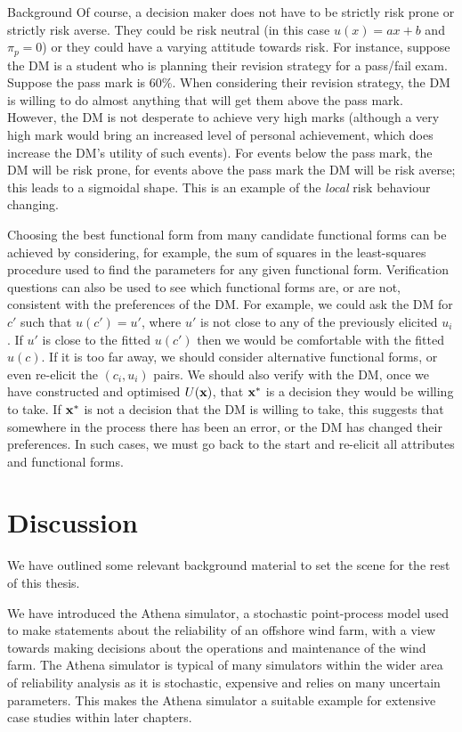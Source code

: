 \begin{chapter}{Background \label{Ch:background}}
Of course, a decision maker does not have to be strictly risk prone or strictly risk averse. They could be risk neutral (in this case $u(x) = ax + b$ and $\pi_p  = 0$) or they could have a varying attitude towards risk. For instance, suppose the DM is a student who is planning their revision strategy for a pass/fail exam. Suppose the pass mark is $60\%$. When considering their revision strategy, the DM is willing to do almost anything that will get them above the pass mark. However, the DM is not desperate to achieve very high marks (although a very high mark would bring an increased level of personal achievement, which does increase the DM's utility of such events). For events below the pass mark, the DM will be risk prone, for events above the pass mark the DM will be risk averse; this leads to a sigmoidal shape. This is an example of the \textit{local} risk behaviour changing.

Choosing the best functional form from many candidate functional forms can be achieved by considering, for example, the sum of squares in the least-squares procedure used to find the parameters for any given functional form. Verification questions can also be used to see which functional forms are, or are not, consistent with the preferences of the DM. For example, we could ask the DM  for $c'$  such that $u(c')  = u'$, where  $u'$ is not close to any of the previously elicited $u_i$. If $u'$ is close to the fitted $u(c')$ then we would be comfortable with the fitted $u(c)$. If it is too far away, we should consider alternative functional forms, or even re-elicit the $(c_i, u_i)$ pairs. We should also verify with the DM, once we have constructed and optimised $U(\mathbf{x})$, that $\mathbf{x}^{*}$ is a decision they would be willing to take. If $\mathbf{x}^{*}$ is not a decision that the DM is willing to take, this suggests that somewhere in the process there has been an error, or the DM has changed their preferences. In such cases, we must go back to the start and re-elicit all attributes and functional forms.

\section{Discussion}

We have outlined some relevant background material to set the scene for the rest of this thesis.

We have introduced the Athena simulator, a stochastic point-process model used to make statements about the reliability of an offshore wind farm, with a view towards making decisions about the operations and maintenance of the wind farm. The Athena simulator is typical of many simulators within the wider area of reliability analysis as it is stochastic, expensive and relies on many uncertain parameters. This makes the Athena simulator a suitable example for extensive case studies within later chapters.


\end{chapter}
